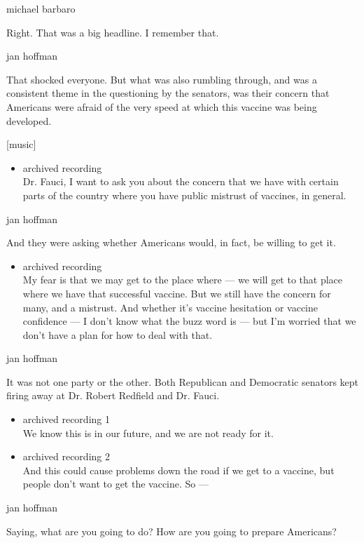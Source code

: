 michael barbaro

Right. That was a big headline. I remember that.

jan hoffman

That shocked everyone. But what was also rumbling through, and was a
consistent theme in the questioning by the senators, was their concern
that Americans were afraid of the very speed at which this vaccine was
being developed.

{[}music{]}

\begin{itemize}
\tightlist
\item
  archived recording\\
  Dr. Fauci, I want to ask you about the concern that we have with
  certain parts of the country where you have public mistrust of
  vaccines, in general.
\end{itemize}

jan hoffman

And they were asking whether Americans would, in fact, be willing to get
it.

\begin{itemize}
\tightlist
\item
  archived recording\\
  My fear is that we may get to the place where --- we will get to that
  place where we have that successful vaccine. But we still have the
  concern for many, and a mistrust. And whether it's vaccine hesitation
  or vaccine confidence --- I don't know what the buzz word is --- but
  I'm worried that we don't have a plan for how to deal with that.
\end{itemize}

jan hoffman

It was not one party or the other. Both Republican and Democratic
senators kept firing away at Dr. Robert Redfield and Dr. Fauci.

\begin{itemize}
\item
  archived recording 1\\
  We know this is in our future, and we are not ready for it.
\item
  archived recording 2\\
  And this could cause problems down the road if we get to a vaccine,
  but people don't want to get the vaccine. So ---
\end{itemize}

jan hoffman

Saying, what are you going to do? How are you going to prepare
Americans?

